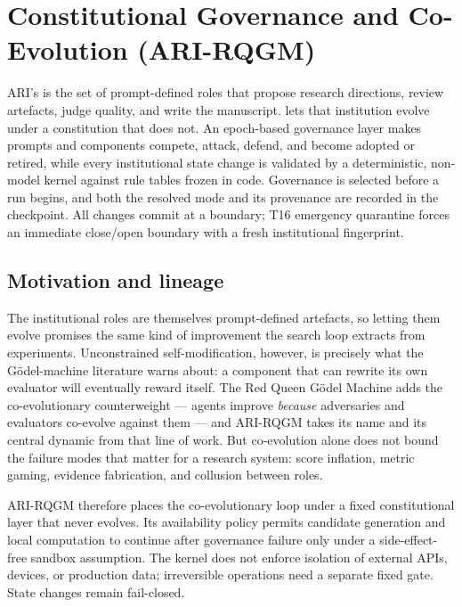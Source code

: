 \section{Constitutional Governance and Co-Evolution (ARI-RQGM)}\label{sec:rqgm}

ARI's  is the set of prompt-defined roles that propose
research directions, review artefacts, judge quality, and write the
manuscript.  lets that institution evolve under a
constitution that does not. An epoch-based governance layer makes prompts
and components compete, attack, defend, and become adopted or retired,
while every institutional state change is validated by a deterministic,
non-model kernel against rule tables frozen in code. Governance is
selected before a run begins, and both the resolved mode and its
provenance are recorded in the checkpoint.
All changes commit at a boundary; T16 emergency quarantine forces an
immediate close/open boundary with a fresh institutional fingerprint.

\subsection{Motivation and lineage}\label{sec:rqgm:motivation}

The institutional roles are themselves prompt-defined artefacts, so
letting them evolve promises the same kind of improvement the search
loop extracts from experiments. Unconstrained self-modification,
however, is precisely what the G\"odel-machine literature warns
about: a component that can rewrite its own evaluator will eventually
reward itself. The Red Queen G\"odel Machine
\cite{iacob2026red} adds the co-evolutionary counterweight --- agents
improve \emph{because} adversaries and evaluators co-evolve against
them --- and ARI-RQGM takes its name and its central dynamic from that
line of work. But co-evolution alone does not bound the failure modes
that matter for a research system: score inflation, metric gaming,
evidence fabrication, and collusion between roles.

ARI-RQGM therefore places the co-evolutionary loop under a fixed
constitutional layer that never evolves. Its availability policy permits
candidate generation and local computation to continue after governance
failure only under a side-effect-free sandbox assumption. The kernel does
not enforce isolation of external APIs, devices, or production data;
irreversible operations need a separate fixed gate. State changes remain
fail-closed.

